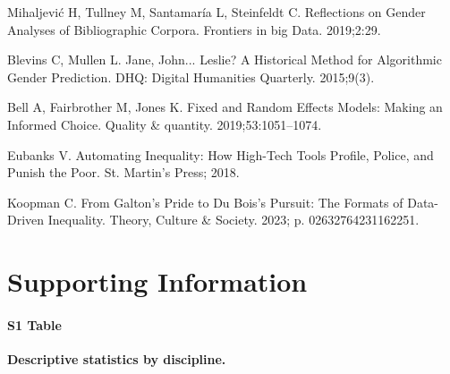 \documentclass[
  10pt,
  letterpaper,
]{article}
\begin{document}
\begin{thebibliography}{10}
Mihaljevi{\'c} H, Tullney M, Santamar{\'i}a L, Steinfeldt C.
\newblock Reflections on Gender Analyses of Bibliographic Corpora.
\newblock Frontiers in big Data. 2019;2:29.

Blevins C, Mullen L.
\newblock Jane, {{John}}... {{Leslie}}? {{A Historical Method}} for {{Algorithmic Gender Prediction}}.
\newblock DHQ: Digital Humanities Quarterly. 2015;9(3).

Bell A, Fairbrother M, Jones K.
\newblock Fixed and Random Effects Models: Making an Informed Choice.
\newblock Quality \& quantity. 2019;53:1051--1074.

Eubanks V.
\newblock Automating Inequality: {{How}} High-Tech Tools Profile, Police, and Punish the Poor.
\newblock St. Martin's Press; 2018.

Koopman C.
\newblock From {{Galton}}'s {{Pride}} to {{Du Bois}}'s {{Pursuit}}: {{The Formats}} of {{Data-Driven Inequality}}.
\newblock Theory, Culture \& Society. 2023; p. 02632764231162251.

\end{thebibliography}

\section{Supporting Information}\label{supporting-information}

\paragraph*{S1 Table}
\label{id}
{\textbf{Descriptive statistics by discipline.}}


\nolinenumbers
\end{document}
